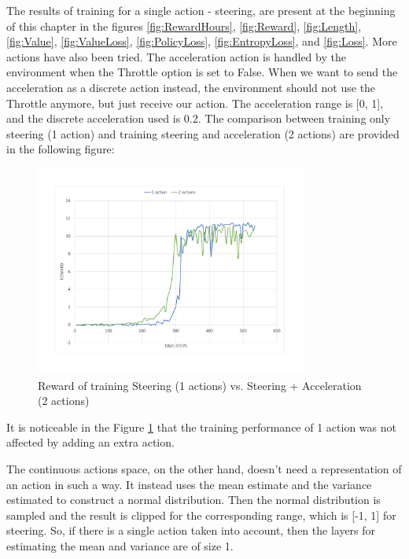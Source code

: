 The results of training for a single action - steering, are present at the beginning of this chapter in the figures \ref{fig:RewardHours}, \ref{fig:Reward}, \ref{fig:Length}, \ref{fig:Value}, \ref{fig:ValueLoss}, \ref{fig:PolicyLoss}, \ref{fig:EntropyLoss}, and \ref{fig:Loss}. More actions have also been tried. The acceleration action is handled by the environment when the Throttle option is set to False. When we want to send the acceleration as a discrete action instead, the environment should not use the Throttle anymore, but just receive our action. The acceleration range is [0, 1], and the discrete acceleration used is 0.2. The comparison between training only steering (1 action) and training steering and acceleration (2 actions) are provided in the following figure:
\begin{figure}[H]
	\centering
	\includegraphics[width=0.8\textwidth]{Figures/2Actions}
	\caption{Reward of training Steering (1 actions) vs. Steering + Acceleration (2 actions)}
	\label{fig:2Actions}
\end{figure}
It is noticeable in the Figure \ref{fig:2Actions} that the training performance of 1 action was not affected by adding an extra action.

The continuous actions space, on the other hand, doesn't need a representation of an action in such a way. It instead uses the mean estimate and the variance estimated to construct a normal distribution. Then the normal distribution is sampled and the result is clipped for the corresponding range, which is [-1, 1] for steering. So, if there is a single action taken into account, then the layers for estimating the mean and variance are of size 1.


